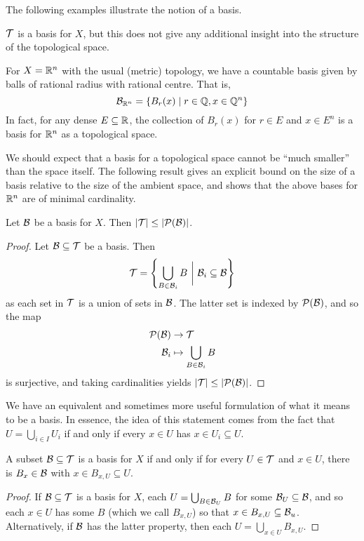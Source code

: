 \documentclass[11pt]{article}
\begin{document}
The following examples illustrate the notion of a basis.
\begin{example}
    \begin{enum2}
    \item $\mathcal{T}$ is a basis for $X$, but this does not give any additional insight into the structure of the topological space.
    \item For $X = \mathbb{R}^n$ with the usual (metric) topology, we have a countable basis given by balls of rational radius with rational centre. That is,
    $$
        \mathcal{B}_{\mathbb{R}^n} = \left\{  B_r(x) \mid r \in \mathbb{Q}, x \in \mathbb{Q}^n  \right\}
    $$
    In fact, for any dense $E \subseteq \mathbb{R}$, the collection of $B_r(x)$ for $r \in E$ and $x \in E^n$ is a basis for $\mathbb{R}^n$ as a topological space.
    \end{enum2}
\end{example}
We should expect that a basis for a topological space cannot be ``much smaller'' than the space itself. The following result gives an explicit bound on the size of a basis relative to the size of the ambient space, and shows that the above bases for $\mathbb{R}^n$ are of minimal cardinality.
\begin{proposition}
    Let $\mathcal{B}$ be a basis for $X$. Then $\left| \mathcal{T} \right| \leq \left| \mathcal{P}(\mathcal{B}) \right|$.
\end{proposition}
\begin{proof}
    Let $\mathcal{B} \subseteq \mathcal{T}$ be a basis. Then
    $$
        \mathcal{T} = \left\{  \bigcup_{B \in \mathcal{B}_i}B \ \bigg| \ \mathcal{B}_i \subseteq \mathcal{B}  \right\}
    $$
    as each set in $\mathcal{T}$ is a union of sets in $\mathcal{B}$. The latter set is indexed by $\mathcal{P}(\mathcal{B})$, and so the map
    \begin{align*}
        \mathcal{P}(\mathcal{B}) &\to \mathcal{T} \\
        \mathcal{B}_i &\mapsto \bigcup_{B \in \mathcal{B}_i}B
    \end{align*}
    is surjective, and taking cardinalities yields $\left| \mathcal{T} \right| \leq \left| \mathcal{P}(\mathcal{B}) \right|$.
\end{proof}
We have an equivalent and sometimes more useful formulation of what it means to be a basis. In essence, the idea of this statement comes from the fact that $U = \bigcup_{i \in I} U_i$ if and only if every $x \in U$ has $x \in U_i \subseteq U$.
\begin{lemma}
    A subset $\mathcal{B} \subseteq \mathcal{T}$ is a basis for $X$ if and only if for every $U \in \mathcal{T}$ and $x \in U$, there is $B_x \in \mathcal{B}$ with $x \in B_{x, U} \subseteq U$.
\end{lemma}
\begin{proof}
    If $\mathcal{B} \subseteq \mathcal{T}$ is a basis for $X$, each $U = \bigcup_{B \in \mathcal{B}_U}B$ for some $\mathcal{B}_U \subseteq \mathcal{B}$, and so each $x \in U$ has some $B$ (which we call $B_{x, U}$) so that $x \in B_{x, U} \subseteq \mathcal{B}_u$. Alternatively, if $\mathcal{B}$ has the latter property, then each $U = \bigcup_{x \in U} B_{x, U}$.
\end{proof}
\end{document}
